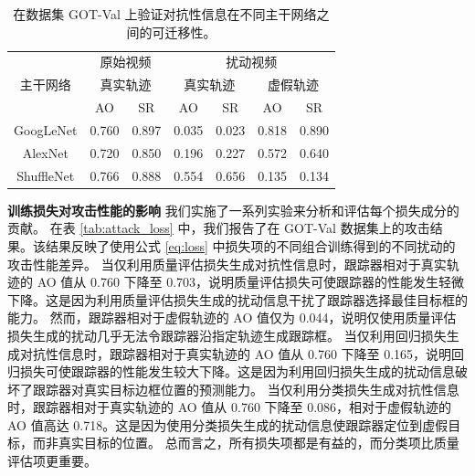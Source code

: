 \begin{table}[t]
\centering
\caption{在数据集 GOT-Val 上验证对抗性信息在不同主干网络之间的可迁移性。}
\begin{tabular}{c cc cc cc} 
\toprule
\multirow{3}{*}[-6pt]{主干网络} & \multicolumn{2}{c}{原始视频}    & \multicolumn{4}{c}{扰动视频}                                        \\ 
\cmidrule(lr){2-3} \cmidrule(lr){4-7}
                          & \multicolumn{2}{c}{真实轨迹} & \multicolumn{2}{c}{真实轨迹} & \multicolumn{2}{c}{虚假轨迹}  \\ 
\cmidrule(lr){2-3} \cmidrule(lr){4-7}
                          & AO    & SR                           & AO    & SR                           & AO    & SR                           \\ 
\midrule
GoogLeNet \cite{GoogLeNet}& 0.760 & 0.897                        & 0.035 & 0.023                        & 0.818 & 0.890                        \\
AlexNet \cite{AlexNet}    & 0.720 & 0.850                        & 0.196 & 0.227                        & 0.572 & 0.640                        \\
ShuffleNet\cite{ShuffleNet}& 0.766 & 0.888                        & 0.554 & 0.656                        & 0.135 & 0.134                        \\
\bottomrule
\end{tabular}
\label{tab:backbone}
\end{table}

\textbf{训练损失对攻击性能的影响} 我们实施了一系列实验来分析和评估每个损失成分的贡献。
在表 \ref{tab:attack_loss} 中，我们报告了在 GOT-Val 数据集上的攻击结果。该结果反映了使用公式 \ref{eq:loss} 中损失项的不同组合训练得到的不同扰动的攻击性能差异。
当仅利用质量评估损失生成对抗性信息时，跟踪器相对于真实轨迹的 AO 值从 0.760 下降至 0.703，说明质量评估损失可使跟踪器的性能发生轻微下降。这是因为利用质量评估损失生成的扰动信息干扰了跟踪器选择最佳目标框的能力。
然而，跟踪器相对于虚假轨迹的 AO 值仅为 0.044，说明仅使用质量评估损失生成的扰动几乎无法令跟踪器沿指定轨迹生成跟踪框。
当仅利用回归损失生成对抗性信息时，跟踪器相对于真实轨迹的 AO 值从 0.760 下降至 0.165，说明回归损失可使跟踪器的性能发生较大下降。这是因为利用回归损失生成的扰动信息破坏了跟踪器对真实目标边框位置的预测能力。
当仅利用分类损失生成对抗性信息时，跟踪器相对于真实轨迹的 AO 值从 0.760 下降至 0.086，相对于虚假轨迹的 AO 值高达 0.718。这是因为使用分类损失生成的扰动信息使跟踪器定位到虚假目标，而非真实目标的位置。
总而言之，所有损失项都是有益的，而分类项比质量评估项更重要。

